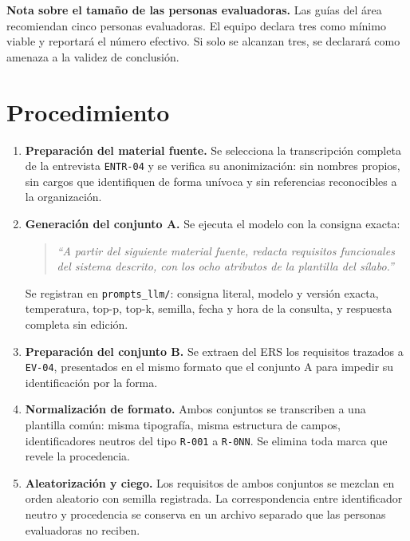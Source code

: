 \documentclass[11pt,a4paper]{article}
\newcommand{\id}[1]{\texttt{#1}}
\begin{document}
\noindent
\textbf{Nota sobre el tamaño de las personas evaluadoras.} Las guías del área recomiendan cinco
personas evaluadoras. El equipo declara tres como mínimo viable y reportará el número efectivo. Si
solo se alcanzan tres, se declarará como amenaza a la validez de conclusión.

\section{Procedimiento}

\begin{enumerate}[leftmargin=1.8em]
  \item \textbf{Preparación del material fuente.} Se selecciona la transcripción completa de la
        entrevista \id{ENTR-04} y se verifica su anonimización: sin nombres propios, sin cargos que
        identifiquen de forma unívoca y sin referencias reconocibles a la organización.

  \item \textbf{Generación del conjunto A.} Se ejecuta el modelo con la consigna exacta:

        \begin{quote}
        \emph{``A partir del siguiente material fuente, redacta requisitos funcionales del sistema
        descrito, con los ocho atributos de la plantilla del sílabo.''}
        \end{quote}

        Se registran en \id{prompts\_llm/}: consigna literal, modelo y versión exacta, temperatura,
        top-p, top-k, semilla, fecha y hora de la consulta, y respuesta completa sin edición.

  \item \textbf{Preparación del conjunto B.} Se extraen del ERS los requisitos trazados a
        \id{EV-04}, presentados en el mismo formato que el conjunto A para impedir su
        identificación por la forma.

  \item \textbf{Normalización de formato.} Ambos conjuntos se transcriben a una plantilla común:
        misma tipografía, misma estructura de campos, identificadores neutros del tipo
        \id{R-001} a \id{R-0NN}. Se elimina toda marca que revele la procedencia.

  \item \textbf{Aleatorización y ciego.} Los requisitos de ambos conjuntos se mezclan en orden
        aleatorio con semilla registrada. La correspondencia entre identificador neutro y
        procedencia se conserva en un archivo separado que las personas evaluadoras no reciben.


\end{enumerate}
\end{document}
